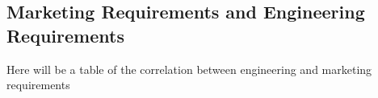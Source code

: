 \subsection{Marketing Requirements and Engineering Requirements}
Here will be a table of the correlation between engineering and marketing requirements